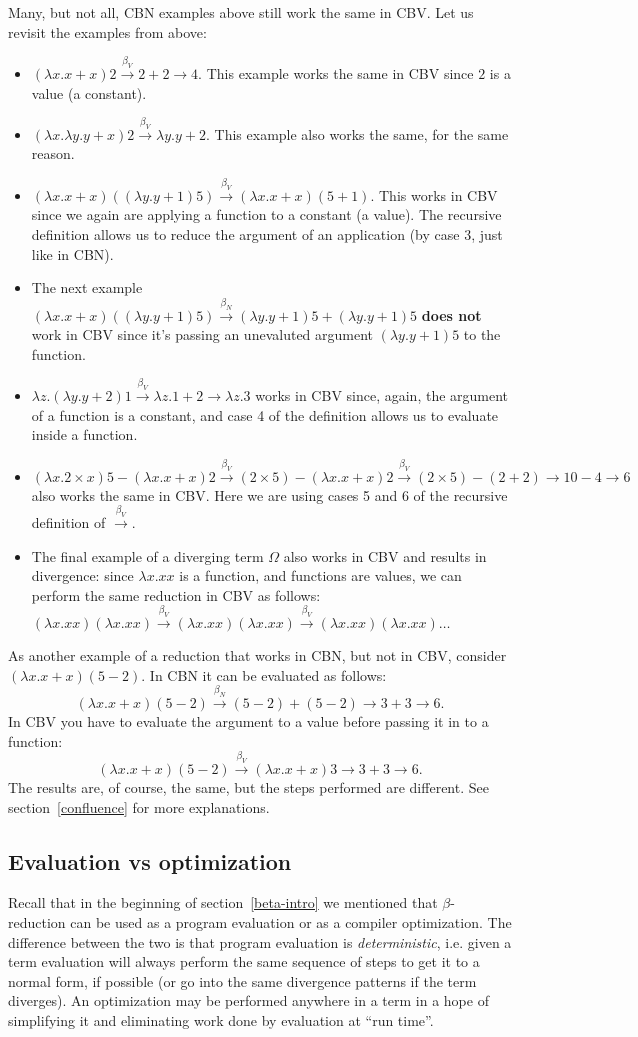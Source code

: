 \documentclass{article}
\newcommand{\lam}{\lambda}
\newcommand{\cbnb}{\overset{\beta_{N}}{\rightarrow}}
\newcommand{\cbvb}{\overset{\beta_{V}}{\rightarrow}}
\begin{document}
Many, but not all, CBN examples above still work the same in CBV. Let us revisit the examples from above:
\begin{itemize}
\item $(\lam x. x + x) 2 \cbvb 2 + 2 \rightarrow 4$. This example works the same in CBV since $2$ is a value (a constant). 
\item $(\lam x. \lam y. y + x) 2 \cbvb \lam y. y + 2$. This example also works the same, for the same reason. 
\item  $(\lam x. x + x)((\lam y. y + 1) 5) \cbvb (\lam x. x + x) (5 + 1)$. This works in CBV since we again are applying a function to a constant (a value). The recursive definition allows us to reduce the argument of an application (by case 3, just like in CBN). 
\item The next example $(\lam x. x + x)((\lam y. y + 1) 5) \cbnb (\lam y. y + 1) 5 + (\lam y. y + 1) 5$ {\bf does not} work in CBV since it's passing an unevaluted argument $(\lam y. y + 1) 5$ to the function. 
\item $\lam z. (\lam y. y + 2) 1 \cbvb \lam z. 1 + 2 \rightarrow \lam z. 3$ works in CBV since, again, the argument of a function is a constant, and case 4 of the definition allows us to evaluate inside a function. 
\item $(\lam x. 2 \times x) 5 - (\lam x. x + x) 2 \cbvb (2 \times 5) -  (\lam x. x + x) 2 \cbvb (2 \times 5) - (2 + 2) \rightarrow 10 - 4 \rightarrow 6$ also works the same in CBV. Here we are using cases 5 and 6 of the recursive definition of $\cbvb$.  
\item The final example of a diverging term $\Omega$ also works in CBV and results in divergence: since $\lam x. xx$ is a function, and functions are values, we can perform the same reduction in CBV as follows:  $(\lam x. xx)(\lam x. xx) \cbvb  (\lam x. xx)(\lam x. xx) \cbvb  (\lam x. xx)(\lam x. xx) \dots$
\end{itemize}
As another example of a reduction that works in CBN, but not in CBV, consider $(\lam x. x + x)(5 - 2)$. In CBN it can be evaluated as follows:
$$
(\lam x. x + x)(5 - 2) \cbnb (5 - 2) + (5 - 2) \rightarrow 3 + 3 \rightarrow 6. 
$$
In CBV you have to evaluate the argument to a value before passing it in to a function:
$$
(\lam x. x + x)(5 - 2) \cbvb (\lam x. x + x) 3 \rightarrow 3 + 3 \rightarrow 6. 
$$
The results are, of course, the same, but the steps performed are different. See section~\ref{confluence} for more explanations. 

\subsection{Evaluation vs optimization}\label{eval}
Recall that in the beginning of section~\ref{beta-intro} we mentioned that $\beta$-reduction can be used as a program evaluation or as a compiler optimization. The difference between the two is that program evaluation is \textit{deterministic}, i.e. given a term evaluation will always perform the same sequence of steps to get it to a normal form, if possible (or go into the same divergence patterns if the term diverges). An optimization may be performed anywhere in a term in a hope of simplifying it and eliminating work done by evaluation at ``run time''. 
\end{document}
